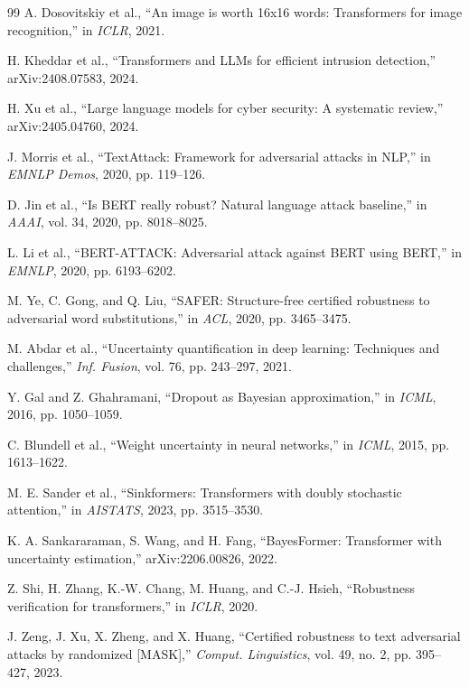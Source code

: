 \documentclass[12pt,a4paper]{article}
\theoremstyle{definition}
\begin{document}
\begin{thebibliography}{99}
A. Dosovitskiy et al., ``An image is worth 16x16 words: Transformers for image recognition,'' in \emph{ICLR}, 2021.

H. Kheddar et al., ``Transformers and LLMs for efficient intrusion detection,'' arXiv:2408.07583, 2024.

H. Xu et al., ``Large language models for cyber security: A systematic review,'' arXiv:2405.04760, 2024.

J. Morris et al., ``TextAttack: Framework for adversarial attacks in NLP,'' in \emph{EMNLP Demos}, 2020, pp. 119--126.

D. Jin et al., ``Is BERT really robust? Natural language attack baseline,'' in \emph{AAAI}, vol. 34, 2020, pp. 8018--8025.

L. Li et al., ``BERT-ATTACK: Adversarial attack against BERT using BERT,'' in \emph{EMNLP}, 2020, pp. 6193--6202.

M. Ye, C. Gong, and Q. Liu, ``SAFER: Structure-free certified robustness to adversarial word substitutions,'' in \emph{ACL}, 2020, pp. 3465--3475.

M. Abdar et al., ``Uncertainty quantification in deep learning: Techniques and challenges,'' \emph{Inf. Fusion}, vol. 76, pp. 243--297, 2021.

Y. Gal and Z. Ghahramani, ``Dropout as Bayesian approximation,'' in \emph{ICML}, 2016, pp. 1050--1059.

C. Blundell et al., ``Weight uncertainty in neural networks,'' in \emph{ICML}, 2015, pp. 1613--1622.

M. E. Sander et al., ``Sinkformers: Transformers with doubly stochastic attention,'' in \emph{AISTATS}, 2023, pp. 3515--3530.

K. A. Sankararaman, S. Wang, and H. Fang, ``BayesFormer: Transformer with uncertainty estimation,'' arXiv:2206.00826, 2022.

Z. Shi, H. Zhang, K.-W. Chang, M. Huang, and C.-J. Hsieh, ``Robustness verification for transformers,'' in \emph{ICLR}, 2020.

J. Zeng, J. Xu, X. Zheng, and X. Huang, ``Certified robustness to text adversarial attacks by randomized [MASK],'' \emph{Comput. Linguistics}, vol. 49, no. 2, pp. 395--427, 2023.


\end{thebibliography}
\end{document}

